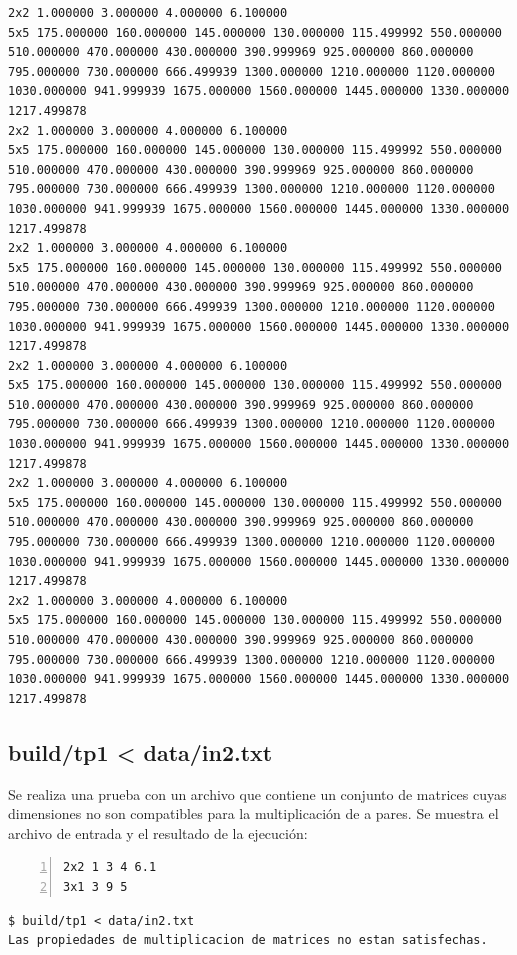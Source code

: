 \documentclass[a4paper,10pt]{article}
\begin{document}
\begin{lstlisting}
2x2 1.000000 3.000000 4.000000 6.100000 
5x5 175.000000 160.000000 145.000000 130.000000 115.499992 550.000000 510.000000 470.000000 430.000000 390.999969 925.000000 860.000000 795.000000 730.000000 666.499939 1300.000000 1210.000000 1120.000000 1030.000000 941.999939 1675.000000 1560.000000 1445.000000 1330.000000 1217.499878 
2x2 1.000000 3.000000 4.000000 6.100000 
5x5 175.000000 160.000000 145.000000 130.000000 115.499992 550.000000 510.000000 470.000000 430.000000 390.999969 925.000000 860.000000 795.000000 730.000000 666.499939 1300.000000 1210.000000 1120.000000 1030.000000 941.999939 1675.000000 1560.000000 1445.000000 1330.000000 1217.499878 
2x2 1.000000 3.000000 4.000000 6.100000 
5x5 175.000000 160.000000 145.000000 130.000000 115.499992 550.000000 510.000000 470.000000 430.000000 390.999969 925.000000 860.000000 795.000000 730.000000 666.499939 1300.000000 1210.000000 1120.000000 1030.000000 941.999939 1675.000000 1560.000000 1445.000000 1330.000000 1217.499878 
2x2 1.000000 3.000000 4.000000 6.100000 
5x5 175.000000 160.000000 145.000000 130.000000 115.499992 550.000000 510.000000 470.000000 430.000000 390.999969 925.000000 860.000000 795.000000 730.000000 666.499939 1300.000000 1210.000000 1120.000000 1030.000000 941.999939 1675.000000 1560.000000 1445.000000 1330.000000 1217.499878 
2x2 1.000000 3.000000 4.000000 6.100000 
5x5 175.000000 160.000000 145.000000 130.000000 115.499992 550.000000 510.000000 470.000000 430.000000 390.999969 925.000000 860.000000 795.000000 730.000000 666.499939 1300.000000 1210.000000 1120.000000 1030.000000 941.999939 1675.000000 1560.000000 1445.000000 1330.000000 1217.499878 
2x2 1.000000 3.000000 4.000000 6.100000 
5x5 175.000000 160.000000 145.000000 130.000000 115.499992 550.000000 510.000000 470.000000 430.000000 390.999969 925.000000 860.000000 795.000000 730.000000 666.499939 1300.000000 1210.000000 1120.000000 1030.000000 941.999939 1675.000000 1560.000000 1445.000000 1330.000000 1217.499878 
\end{lstlisting}

\subsection{build/tp1 < data/in2.txt}
Se realiza una prueba con un archivo que contiene un conjunto de matrices cuyas dimensiones no son compatibles para la multiplicaci\'on de a pares. Se muestra el archivo de entrada y el resultado de la ejecuci\'on:

\begin{lstlisting}[numbers=left,language=bash]
2x2 1 3 4 6.1
3x1 3 9 5
\end{lstlisting}
\begin{lstlisting}
$ build/tp1 < data/in2.txt
Las propiedades de multiplicacion de matrices no estan satisfechas.
\end{lstlisting}
\end{document}
